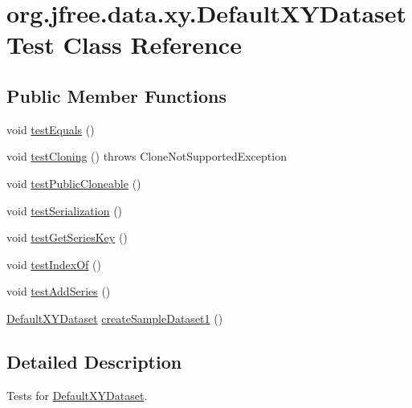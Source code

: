 \hypertarget{classorg_1_1jfree_1_1data_1_1xy_1_1_default_x_y_dataset_test}{}\section{org.\+jfree.\+data.\+xy.\+Default\+X\+Y\+Dataset\+Test Class Reference}
\label{classorg_1_1jfree_1_1data_1_1xy_1_1_default_x_y_dataset_test}
\subsection*{Public Member Functions}
\begin{DoxyCompactItemize}
\item 
void \mbox{\hyperlink{classorg_1_1jfree_1_1data_1_1xy_1_1_default_x_y_dataset_test_aec098d8be39eac04e839d2c8965d76c8}{test\+Equals}} ()
\item 
void \mbox{\hyperlink{classorg_1_1jfree_1_1data_1_1xy_1_1_default_x_y_dataset_test_ab14b3c90446d4f24a7c8b800194e3031}{test\+Cloning}} ()  throws Clone\+Not\+Supported\+Exception 
\item 
void \mbox{\hyperlink{classorg_1_1jfree_1_1data_1_1xy_1_1_default_x_y_dataset_test_a9335d11574bbe06602954409f55f0cb5}{test\+Public\+Cloneable}} ()
\item 
void \mbox{\hyperlink{classorg_1_1jfree_1_1data_1_1xy_1_1_default_x_y_dataset_test_a91e8123ce81eeed1ce69e775d4931adc}{test\+Serialization}} ()
\item 
void \mbox{\hyperlink{classorg_1_1jfree_1_1data_1_1xy_1_1_default_x_y_dataset_test_a33118ef5699c37504f9b47e0d365d6fa}{test\+Get\+Series\+Key}} ()
\item 
void \mbox{\hyperlink{classorg_1_1jfree_1_1data_1_1xy_1_1_default_x_y_dataset_test_a09be7362daadbc02e28a9f722a93e6f6}{test\+Index\+Of}} ()
\item 
void \mbox{\hyperlink{classorg_1_1jfree_1_1data_1_1xy_1_1_default_x_y_dataset_test_a33ba107ba58aa6f10fb0e3874c810e09}{test\+Add\+Series}} ()
\item 
\mbox{\hyperlink{classorg_1_1jfree_1_1data_1_1xy_1_1_default_x_y_dataset}{Default\+X\+Y\+Dataset}} \mbox{\hyperlink{classorg_1_1jfree_1_1data_1_1xy_1_1_default_x_y_dataset_test_a74888c2da721dfd2a9da0ba78721c612}{create\+Sample\+Dataset1}} ()
\end{DoxyCompactItemize}


\subsection{Detailed Description}
Tests for \mbox{\hyperlink{classorg_1_1jfree_1_1data_1_1xy_1_1_default_x_y_dataset}{Default\+X\+Y\+Dataset}}. 

